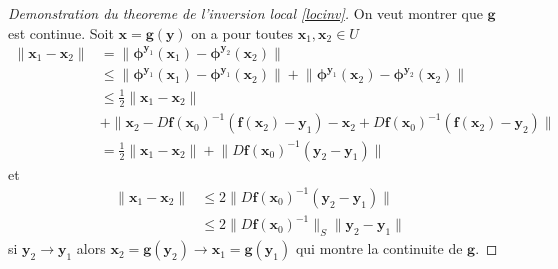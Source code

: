 \begin{proof}[Demonstration du theoreme de l'inversion local \ref{locinv}]
On veut montrer que $\boldsymbol{g}$ est continue. Soit $\boldsymbol{x}=\boldsymbol{g}(\boldsymbol{y})$ on a pour toutes $\boldsymbol{x}_{1},\boldsymbol{x}_{2}\in U$ 
\begin{align*}
\lVert \boldsymbol{x}_{1}-\boldsymbol{x}_{2} \rVert  & =\lVert \boldsymbol{\phi}^{\boldsymbol{y}_{1}}(\boldsymbol{x}_{1})-\boldsymbol{\phi}^{\boldsymbol{y}_{2}}(\boldsymbol{x}_{2}) \rVert  \\
 & \le \lVert \boldsymbol{\phi}^{\boldsymbol{y}_{1}}(\boldsymbol{x}_{1})-\boldsymbol{\phi}^{\boldsymbol{y}_{1}}(\boldsymbol{x}_{2}) \rVert +\lVert \boldsymbol{\phi}^{\boldsymbol{y}_{1}}(\boldsymbol{x}_{2})-\boldsymbol{\phi}^{\boldsymbol{y}_{2}}(\boldsymbol{x}_{2}) \rVert \\
 & \le \frac{1}{2}\lVert \boldsymbol{x}_{1}-\boldsymbol{x}_{2} \rVert  \\
 & +\lVert \boldsymbol{x}_{2}-D\boldsymbol{f}(\boldsymbol{x}_{0})^{-1}(\boldsymbol{f}(\boldsymbol{x}_{2})-\boldsymbol{y}_{1})-\boldsymbol{x}_{2}+D\boldsymbol{f}(\boldsymbol{x}_{0})^{-1}(\boldsymbol{f}(\boldsymbol{x}_{2})-\boldsymbol{y}_{2}) \rVert   \\
 & =\frac{1}{2}\lVert \boldsymbol{x}_{1}-\boldsymbol{x}_{2} \rVert +\lVert D\boldsymbol{f}(\boldsymbol{x}_{0})^{-1}(\boldsymbol{y}_{2}-\boldsymbol{y}_{1}) \rVert 
\end{align*}
et
\begin{align*}
\lVert \boldsymbol{x}_{1}-\boldsymbol{x}_{2} \rVert  & \le  2\lVert D\boldsymbol{f}(\boldsymbol{x}_{0})^{-1}(\boldsymbol{y}_{2}-\boldsymbol{y}_{1}) \rVert  \\
 & \le 2\lVert D\boldsymbol{f}(\boldsymbol{x}_{0})^{-1}  \rVert_{S} \lVert \boldsymbol{y}_{2}-\boldsymbol{y}_{1} \rVert  
\end{align*}
si $\boldsymbol{y}_{2}\to \boldsymbol{y}_{1}$ alors $\boldsymbol{x}_{2}=\boldsymbol{g}(\boldsymbol{y}_{2})\to \boldsymbol{x}_{1}=\boldsymbol{g}(\boldsymbol{y}_{1})$ qui montre la continuite de $\boldsymbol{g}$.


\end{proof}
